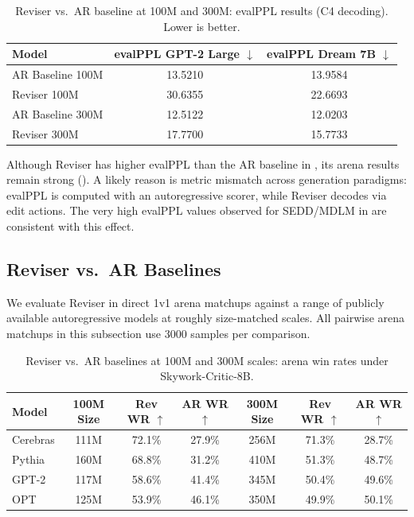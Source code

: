 \documentclass[11pt]{article}
\begin{document}
\begin{table}[tbp]
\centering
\small
\setlength{\tabcolsep}{7pt}
\begin{tabular}{lcc}
\toprule
Model & evalPPL GPT-2 Large $\downarrow$ & evalPPL Dream 7B $\downarrow$ \\
\midrule
AR Baseline 100M & \num{13.5210} & \num{13.9584} \\
Reviser 100M & \num{30.6355} & \num{22.6693} \\
AR Baseline 300M & \num{12.5122} & \num{12.0203} \\
Reviser 300M & \num{17.7700} & \num{15.7733} \\
\bottomrule
\end{tabular}
\caption{Reviser vs.\ AR baseline at 100M and 300M: evalPPL results (C4 decoding). Lower is better.}
\label{tab:evalppl_vs_ar_baseline}
\end{table}

Although Reviser has higher evalPPL than the AR baseline in , its arena results remain strong (). A likely reason is metric mismatch across generation paradigms: evalPPL is computed with an autoregressive scorer, while Reviser decodes via edit actions. The very high evalPPL values observed for SEDD/MDLM in  are consistent with this effect.

\subsection{Reviser vs.\ AR Baselines}
\label{sec:ar_baselines}

We evaluate Reviser in direct 1v1 arena matchups against a range of publicly available autoregressive models at roughly size-matched scales.
All pairwise arena matchups in this subsection use 3000 samples per comparison.

\begin{table}[tbp]
\centering
\small
\setlength{\tabcolsep}{5pt}
\begin{tabular}{l ccc ccc}
\toprule
Model & 100M Size & Rev WR $\uparrow$ & AR WR $\uparrow$ & 300M Size & Rev WR $\uparrow$ & AR WR $\uparrow$ \\
\midrule
Cerebras                & 111M & \num{72.1}\% & \num{27.9}\% & 256M & \num{71.3}\% & \num{28.7}\% \\
Pythia                  & 160M & \num{68.8}\% & \num{31.2}\% & 410M & \num{51.3}\% & \num{48.7}\% \\
GPT-2                   & 117M & \num{58.6}\% & \num{41.4}\% & 345M & \num{50.4}\% & \num{49.6}\% \\
OPT                     & 125M & \num{53.9}\% & \num{46.1}\% & 350M & \num{49.9}\% & \num{50.1}\% \\
\bottomrule
\end{tabular}
\caption{Reviser vs.\ AR baselines at 100M and 300M scales: arena win rates under Skywork-Critic-8B.}
\label{tab:ar_baselines_100m}
\end{table}
\end{document}
